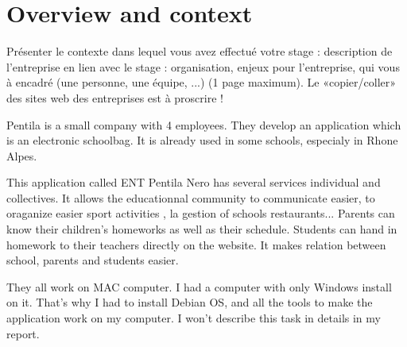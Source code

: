 
\section{Overview and context}

Présenter le contexte dans lequel vous avez effectué votre stage : description de l’entreprise en lien avec le stage : organisation, enjeux pour l’entreprise, qui vous à encadré (une personne, une équipe, ...) (1 page maximum). Le «copier/coller» des sites web des entreprises est à proscrire !
\newline

Pentila is a small company with 4 employees. They develop an application which is an electronic schoolbag. 
It is already used in some schools, especialy in Rhone Alpes. 

This application called ENT Pentila Nero has several services individual and collectives. It allows the educationnal community to communicate easier, to oraganize easier sport activities
, la gestion of schools restaurants... 
Parents can know their children's homeworks as well as their schedule. Students can hand in homework to their teachers directly on the website. It makes relation between school, parents and students easier. 

They all work on MAC computer. I had a computer with only Windows install on it. 
	That's why I had to install Debian OS, and all the tools to make the application work on my computer. I won't describe this task in details in my report. 





